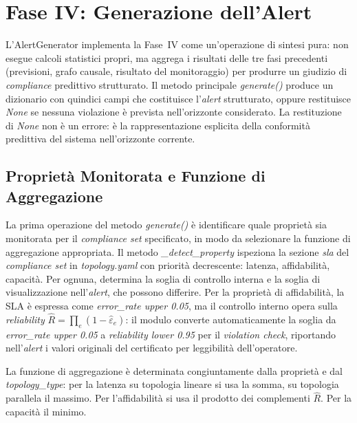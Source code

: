 \section{Fase IV: Generazione dell'Alert}
\label{sec:impl_fase4}

L'AlertGenerator implementa la Fase~IV come un'operazione di sintesi pura: non esegue calcoli
statistici propri, ma aggrega i risultati delle tre fasi precedenti (previsioni, grafo causale,
risultato del monitoraggio) per produrre un giudizio di \textit{compliance} predittivo
strutturato. Il metodo principale \textit{generate()} produce un dizionario con quindici campi
che costituisce l'\textit{alert} strutturato, oppure restituisce \textit{None} se nessuna
violazione è prevista nell'orizzonte considerato. La restituzione di \textit{None} non è un
errore: è la rappresentazione esplicita della conformità predittiva del sistema nell'orizzonte
corrente.

\subsection{Proprietà Monitorata e Funzione di Aggregazione}
\label{subsec:property_detection}

La prima operazione del metodo \textit{generate()} è identificare quale proprietà sia monitorata
per il \textit{compliance set} specificato, in modo da selezionare la funzione di aggregazione
appropriata. Il metodo \textit{\_detect\_property} ispeziona la sezione \textit{sla} del
\textit{compliance set} in \textit{topology.yaml} con priorità decrescente: latenza, affidabilità,
capacità. Per ognuna, determina la soglia di controllo interna e la soglia di visualizzazione
nell'\textit{alert}, che possono differire. Per la proprietà di affidabilità, la \gls{SLA} è
espressa come \textit{error\_rate upper 0.05}, ma il controllo interno opera sulla
\textit{reliability} $\hat{R} = \prod_e (1 - \hat{\varepsilon}_e)$: il modulo converte
automaticamente la soglia da \textit{error\_rate upper 0.05} a \textit{reliability lower 0.95}
per il \textit{violation check}, riportando nell'\textit{alert} i valori originali del certificato
per leggibilità dell'operatore.

La funzione di aggregazione è determinata congiuntamente dalla proprietà e dal
\textit{topology\_type}: per la latenza su topologia lineare si usa la somma, su topologia
parallela il massimo. Per l'affidabilità si usa il prodotto dei complementi $\hat{R}$. Per la capacità il minimo.

